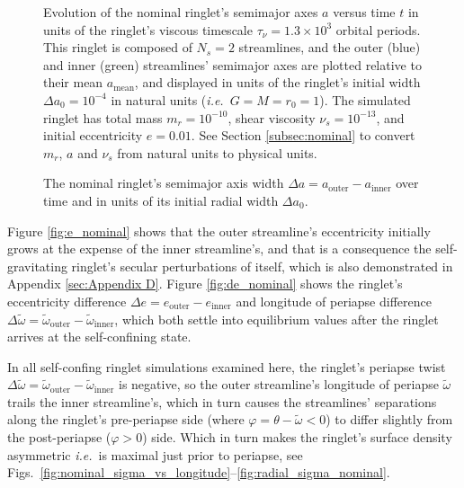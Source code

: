 \documentclass[preprint]{aastex62}
\begin{document}
\begin{figure}
\caption{
\label{fig:a_nominal}
Evolution of the nominal ringlet's semimajor axes $a$
versus time $t$ in units of the ringlet's viscous timescale
$\tau_\nu=1.3\times10^3$ orbital periods. This ringlet is composed of $N_s=2$ streamlines,
and the outer (blue) and inner (green) streamlines' semimajor axes are plotted relative
to their mean $a_{\text{mean}}$, and displayed in units of the ringlet's
initial width $\Delta a_0 = 10^{-4}$ in natural units ({\it i.e.}\ $G=M=r_0=1$).
The simulated ringlet has total mass $m_r=10^{-10}$, shear viscosity $\nu_s=10^{-13}$,
and initial eccentricity $e=0.01$. See Section \ref{subsec:nominal} to convert
$m_r$, $a$ and $\nu_s$ from natural units to physical units.}
\end{figure}

\begin{figure}
\caption{
\label{fig:da_nominal}
The nominal ringlet's semimajor axis width $\Delta a = a_{\text{outer}} - a_{\text{inner}}$ over time
and in units of its initial radial width $\Delta a_0$.}
\end{figure}

Figure \ref{fig:e_nominal} shows that the outer streamline's eccentricity initially grows at the
expense of the inner streamline's, and that is a consequence the self-gravitating ringlet's
secular perturbations of itself, which is also demonstrated in Appendix \ref{sec:Appendix D}. 
Figure \ref{fig:de_nominal} shows
the ringlet's eccentricity difference $\Delta e = e_{\text{outer}} - e_{\text{inner}}$
and longitude of periapse difference
$\Delta\tilde{\omega} = \tilde{\omega}_{\text{outer}} - \tilde{\omega}_{\text{inner}}$,
which both settle into equilibrium values after the ringlet arrives at the self-confining
state. 

In all self-confing ringlet simulations examined here, the ringlet's periapse twist 
$\Delta\tilde{\omega} = \tilde{\omega}_{\text{outer}} - \tilde{\omega}_{\text{inner}}$ is negative,
so the outer streamline's longitude of periapse $\tilde{\omega}$ trails
the inner streamline's, which in turn causes the streamlines' separations along
the ringlet's pre-periapse side (where $\varphi = \theta - \tilde{\omega} < 0$) 
to differ slightly from the post-periapse ($\varphi>0$) side.
Which in turn makes the ringlet's surface density asymmetric {\it i.e.}\ is
maximal just prior to periapse, see
Figs.\ \ref{fig:nominal_sigma_vs_longitude}--\ref{fig:radial_sigma_nominal}.
\end{document}
